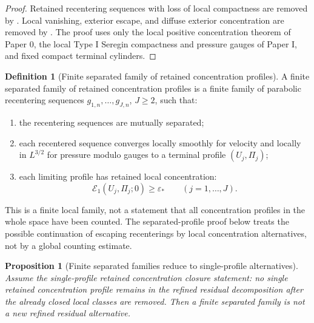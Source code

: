 \documentclass[11pt]{amsart}
\numberwithin{equation}{section}
\theoremstyle{plain}
\newtheorem{proposition}[theorem]{Proposition}
\theoremstyle{definition}
\newtheorem{definition}[theorem]{Definition}
\theoremstyle{remark}
\newcommand{\eps}{\varepsilon}
\newcommand{\calE}{\mathcal E}
\begin{document}
\begin{proof}
Retained recentering sequences with loss of local compactness are removed by
.  Local vanishing, exterior escape, and
diffuse exterior concentration are removed by
.  The proof uses only the local positive
concentration theorem of Paper 0, the local Type I Seregin compactness and
pressure gauges of Paper I, and fixed compact terminal cylinders.
\end{proof}

\begin{definition}[Finite separated family of retained concentration profiles]
\label{def:finite-separated-profile-family}
A finite separated family of retained concentration profiles is a finite
family of parabolic recentering sequences
\(g_{1,n},\dots,g_{J,n}\), \(J\ge2\), such that:
\begin{enumerate}[label=(\roman*)]
   \item the recentering sequences are mutually separated;
   \item each recentered sequence converges locally smoothly for velocity and
   locally in \(L^{3/2}\) for pressure modulo gauges to a terminal profile
   \((U_j,\Pi_j)\);
   \item each limiting profile has retained local concentration:
\[
   \calE_1(U_j,\Pi_j;0)\ge\eps_*
   \qquad (j=1,\dots,J).
\]
\end{enumerate}
This is a finite local family, not a statement that all concentration profiles
in the whole space have been counted.  The separated-profile proof below treats
the possible continuation of escaping recenterings by local concentration
alternatives, not by a global counting estimate.
\end{definition}

\begin{proposition}[Finite separated families reduce to single-profile alternatives]
\label{prop:multi-no-new-obstruction}
Assume the single-profile retained concentration closure statement: no
single retained concentration profile remains in the refined residual decomposition after the already
closed local classes are removed.  Then a finite separated family is not
a new refined residual alternative.
\end{proposition}
\end{document}
